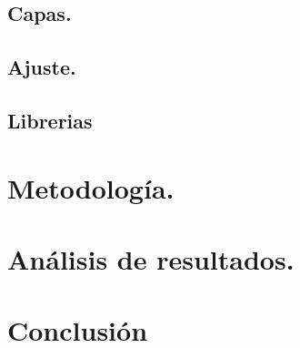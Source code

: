 \documentclass[a4paper, 12pt]{article}
\begin{document}
    \subsection{Capas.}
    \subsection{Ajuste.}
    \subsection{Librerias}

    \section{Metodología.}

    \section{Análisis de resultados.}

    \section{Conclusión}
    \printbibliography
\end{document}
